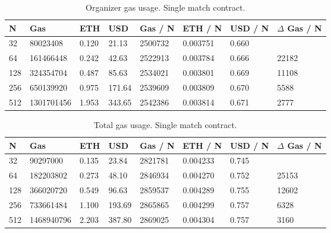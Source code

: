 \begin{table}[h]
\centering
\caption{Organizer gas usage. Single match contract.}
\label{tab:org-gas-usage-single}
\begin{tabular}{|l|l|l|l|l|l|l|l|}
\hline

N & Gas & ETH & USD & Gas / N & ETH / N & USD / N & $\Delta$ Gas / N \\ \hline
32 & 80023408 & 0.120 & 21.13 & 2500732 & 0.003751 & 0.660 &  \\ \hline
64 & 161466448 & 0.242 & 42.63 & 2522913 & 0.003784 & 0.666 & 22182 \\ \hline
128 & 324354704 & 0.487 & 85.63 & 2534021 & 0.003801 & 0.669 & 11108 \\ \hline
256 & 650139920 & 0.975 & 171.64 & 2539609 & 0.003809 & 0.670 & 5588 \\ \hline
512 & 1301701456 & 1.953 & 343.65 & 2542386 & 0.003814 & 0.671 & 2777 \\ \hline

\end{tabular}
\end{table}

\begin{table}[h]
\centering
\caption{Total gas usage. Single match contract.}
\label{tab:total-gas-usage-single}
\begin{tabular}{|l|l|l|l|l|l|l|l|}
\hline

N & Gas & ETH & USD & Gas / N & ETH / N & USD / N & $\Delta$ Gas / N \\ \hline
32 & 90297000 & 0.135 & 23.84 & 2821781 & 0.004233 & 0.745 &  \\ \hline
64 & 182203802 & 0.273 & 48.10 & 2846934 & 0.004270 & 0.752 & 25153 \\ \hline
128 & 366020720 & 0.549 & 96.63 & 2859537 & 0.004289 & 0.755 & 12602 \\ \hline
256 & 733661484 & 1.100 & 193.69 & 2865865 & 0.004299 & 0.757 & 6328 \\ \hline
512 & 1468940796 & 2.203 & 387.80 & 2869025 & 0.004304 & 0.757 & 3160 \\ \hline

\end{tabular}
\end{table}

